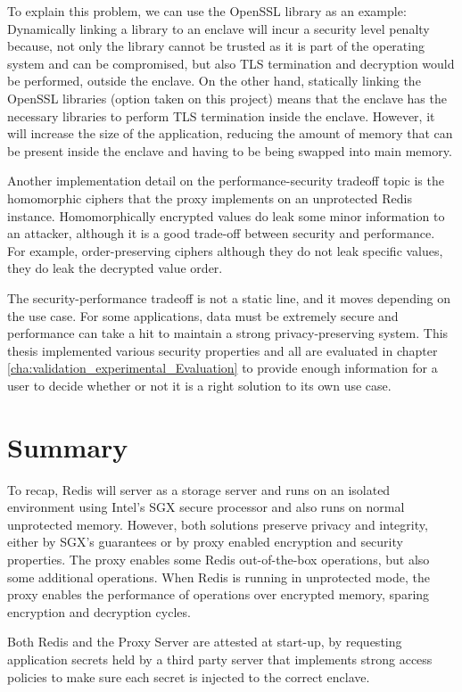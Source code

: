 To explain this problem, we can use the OpenSSL library as an example: Dynamically linking a library to an enclave will incur a security level penalty because, not only the library cannot be trusted as it is part of the operating system and can be compromised, but also \gls{TLS} termination and decryption would be performed, outside the enclave. On the other hand, statically linking the OpenSSL libraries (option taken on this project) means that the enclave has the necessary libraries to perform \gls{TLS} termination inside the enclave. However, it will increase the size of the application, reducing the amount of memory that can be present inside the enclave and having to be being swapped into main memory.

Another implementation detail on the performance-security tradeoff topic is the homomorphic ciphers that the proxy implements on an unprotected Redis instance. Homomorphically encrypted values do leak some minor information to an attacker, although it is a good trade-off between security and performance. For example, order-preserving ciphers although they do not leak specific values, they do leak the decrypted value order.

The security-performance tradeoff is not a static line, and it moves depending on the use case. For some applications, data must be extremely secure and performance can take a hit to maintain a strong privacy-preserving system. This thesis implemented various security properties and all are evaluated in chapter \ref{cha:validation_experimental_Evaluation} to provide enough information for a user to decide whether or not it is a right solution to its own use case.

\section{Summary}
\label{sec:chapter4_summary}

To recap, Redis will server as a storage server and runs on an isolated environment using Intel's \gls{SGX} secure processor and also runs on normal unprotected memory. However, both solutions preserve privacy and integrity, either by \gls{SGX}'s guarantees or by proxy enabled encryption and security properties. The proxy enables some Redis out-of-the-box operations, but also some additional operations. When Redis is running in unprotected mode, the proxy enables the performance of operations over encrypted memory, sparing encryption and decryption cycles.

Both Redis and the Proxy Server are attested at start-up, by requesting application secrets held by a third party server that implements strong access policies to make sure each secret is injected to the correct enclave. 

